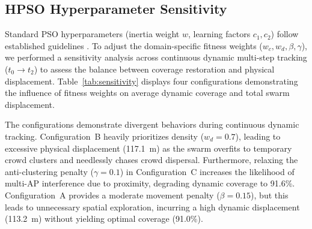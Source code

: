 \subsection{HPSO Hyperparameter Sensitivity}
\label{sec:hyperparams}

Standard PSO hyperparameters (inertia weight $w$, learning factors $c_1, c_2$) follow established guidelines \cite{b11,b13}. To adjust the domain-specific fitness weights ($w_c, w_d, \beta, \gamma$), we performed a sensitivity analysis across continuous dynamic multi-step tracking ($t_0 \to t_2$) to assess the balance between coverage restoration and physical displacement. Table~\ref{tab:sensitivity} displays four configurations demonstrating the influence of fitness weights on average dynamic coverage and total swarm displacement.

\begin{table}[t]
\centering
\caption{Fitness Weight Sensitivity Analysis}
\label{tab:sensitivity}
\vspace{-5pt}
\end{table}

The configurations demonstrate divergent behaviors during continuous dynamic tracking. Configuration~B heavily prioritizes density ($w_d=0.7$), leading to excessive physical displacement (117.1~m) as the swarm overfits to temporary crowd clusters and needlessly chases crowd dispersal. Furthermore, relaxing the anti-clustering penalty ($\gamma=0.1$) in Configuration~C increases the likelihood of multi-AP interference due to proximity, degrading dynamic coverage to 91.6\%. Configuration~A provides a moderate movement penalty ($\beta=0.15$), but this leads to unnecessary spatial exploration, incurring a high dynamic displacement (113.2~m) without yielding optimal coverage (91.0\%).

